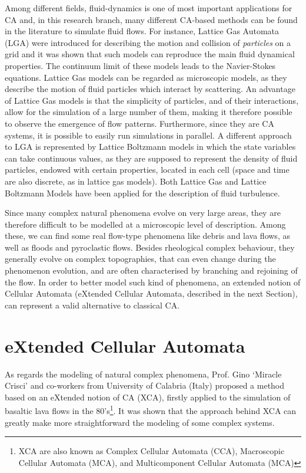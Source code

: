 Among different fields, fluid-dynamics is one of most important
applications for CA and, in this research branch, many different
CA-based methods can be found in the literature to simulate fluid flows.  For instance, Lattice Gas
Automata (LGA) were introduced for describing the motion and collision of
\emph{particles} on a grid and it was shown that such models can
reproduce the main fluid dynamical properties. The continuum limit of
these models leads to the Navier-Stokes equations. Lattice Gas models
can be regarded as microscopic models, as they describe the motion of
fluid particles which interact by scattering. An advantage of Lattice
Gas models is that the simplicity of particles, and of their
interactions, allow for the simulation of a large number of them,
making it therefore possible to observe the emergence of flow
patterns. Furthermore, since they are CA systems, it is possible to easily
run simulations in parallel. A different approach to LGA
is represented by Lattice Boltzmann models in which the state
variables can take continuous values, as they are supposed to
represent the density of fluid particles, endowed with certain
properties, located in each cell (space and time are also discrete, as
in lattice gas models). Both Lattice Gas and Lattice Boltzmann Models
have been applied for the description of fluid turbulence.

Since many complex natural phenomena evolve on very large areas,
they are therefore difficult to be modelled at a microscopic level of
description. Among these, we can find some real flow-type phenomena
like debris and lava flows, as well as floods and pyroclastic
flows. Besides rheological complex behaviour, they generally evolve on
complex topographies, that can even change during the phenomenon
evolution, and are often characterised by branching and rejoining of
the flow. In order to better model such kind of phenomena, an extended
notion of Cellular Automata (eXtended Cellular Automata, described in the next Section), can
represent a valid alternative to classical CA.

\section{eXtended Cellular Automata}

As regards the modeling of natural complex phenomena, Prof. Gino `Miracle Crisci' and
co-workers from University of Calabria (Italy) proposed a method based
on an eXtended notion of CA (XCA), firstly applied to the simulation
of basaltic lava flows in the 80's\footnote{XCA are also known as
  Complex Cellular Automata (CCA), Macroscopic Cellular Automata
  (MCA), and Multicomponent Cellular Automata (MCA)}. It was shown
that the approach behind XCA can greatly make more straightforward the
modeling of some complex systems.

